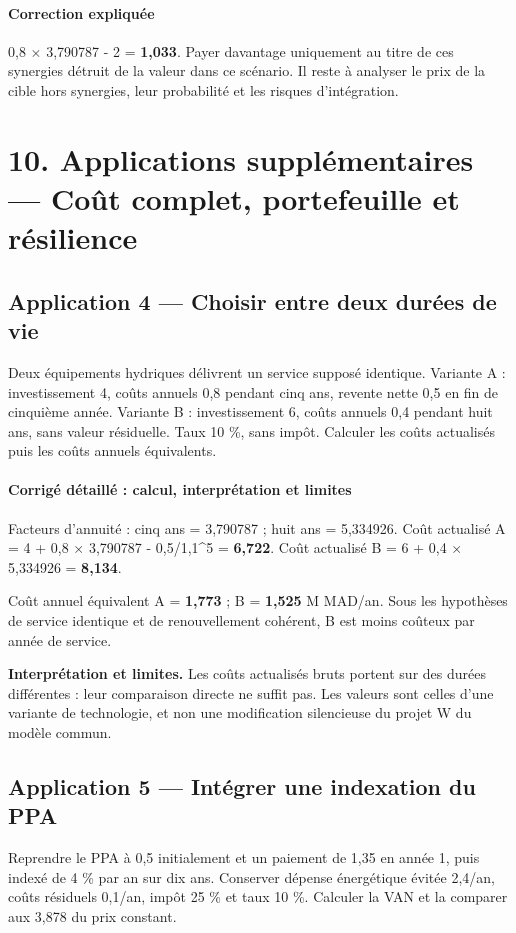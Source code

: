 \documentclass[12pt,a4paper]{article}
\begin{document}
\paragraph{Correction expliquée}
0,8 $\times$ 3,790787 - 2 = \textbf{1,033}. Payer davantage uniquement au titre de ces synergies détruit de la valeur dans ce scénario. Il reste à analyser le prix de la cible hors synergies, leur probabilité et les risques d’intégration.

\section*{10. Applications supplémentaires --- Coût complet, portefeuille et résilience}

\subsection*{Application 4 --- Choisir entre deux durées de vie}
Deux équipements hydriques délivrent un service supposé identique. Variante A : investissement 4, coûts annuels 0,8 pendant cinq ans, revente nette 0,5 en fin de cinquième année. Variante B : investissement 6, coûts annuels 0,4 pendant huit ans, sans valeur résiduelle. Taux 10 \%, sans impôt. Calculer les coûts actualisés puis les coûts annuels équivalents.


\paragraph{Corrigé détaillé : calcul, interprétation et limites}
Facteurs d’annuité : cinq ans = 3,790787 ; huit ans = 5,334926. Coût actualisé A = 4 + 0,8 $\times$ 3,790787 - 0,5/1,1\textasciicircum{}5 = \textbf{6,722}. Coût actualisé B = 6 + 0,4 $\times$ 5,334926 = \textbf{8,134}.

Coût annuel équivalent A = \textbf{1,773} ; B = \textbf{1,525} M MAD/an. Sous les hypothèses de service identique et de renouvellement cohérent, B est moins coûteux par année de service.

\textbf{Interprétation et limites.} Les coûts actualisés bruts portent sur des durées différentes : leur comparaison directe ne suffit pas. Les valeurs sont celles d’une variante de technologie, et non une modification silencieuse du projet W du modèle commun.


\subsection*{Application 5 --- Intégrer une indexation du PPA}
Reprendre le PPA à 0,5 initialement et un paiement de 1,35 en année 1, puis indexé de 4 \% par an sur dix ans. Conserver dépense énergétique évitée 2,4/an, coûts résiduels 0,1/an, impôt 25 \% et taux 10 \%. Calculer la VAN et la comparer aux 3,878 du prix constant.
\end{document}

